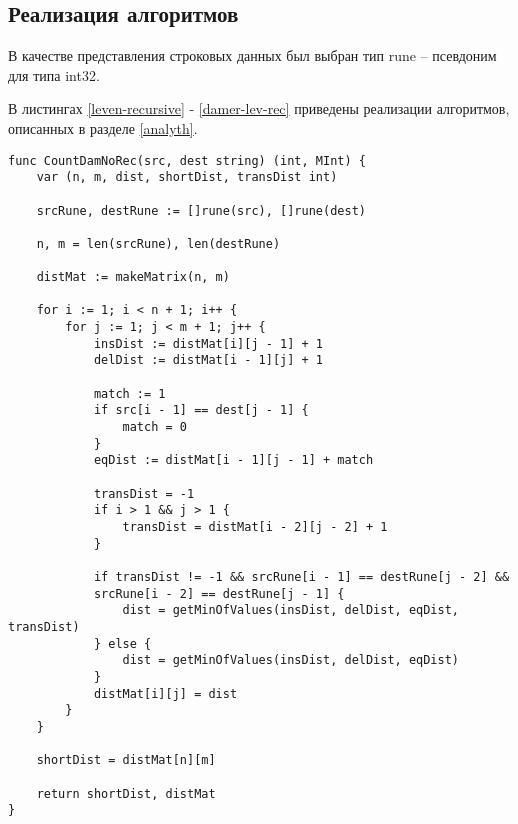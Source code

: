 \subsection{Реализация алгоритмов}

В качестве представления строковых данных был выбран тип rune\cite{rune} -- псевдоним для типа int32. 

В листингах \ref{leven-recursive} - \ref{damer-lev-rec} приведены реализации алгоритмов, описанных в разделе \ref{analyth}.


\begin{lstlisting}[label=leven-recursive,caption=Программный код нахождения расстояния Дамерау\,--\,Левенштейна итеративно]
func CountDamNoRec(src, dest string) (int, MInt) {
	var (n, m, dist, shortDist, transDist int)
	
	srcRune, destRune := []rune(src), []rune(dest)
	
	n, m = len(srcRune), len(destRune)
	
	distMat := makeMatrix(n, m)
	
	for i := 1; i < n + 1; i++ {
		for j := 1; j < m + 1; j++ {
			insDist := distMat[i][j - 1] + 1
			delDist := distMat[i - 1][j] + 1
			
			match := 1
			if src[i - 1] == dest[j - 1] {
				match = 0
			}
			eqDist := distMat[i - 1][j - 1] + match
			
			transDist = -1
			if i > 1 && j > 1 {
				transDist = distMat[i - 2][j - 2] + 1
			}
			
			if transDist != -1 && srcRune[i - 1] == destRune[j - 2] && 
			srcRune[i - 2] == destRune[j - 1] {
				dist = getMinOfValues(insDist, delDist, eqDist, transDist)
			} else {
				dist = getMinOfValues(insDist, delDist, eqDist)
			}
			distMat[i][j] = dist
		}
	}
	
	shortDist = distMat[n][m]
	
	return shortDist, distMat
}
\end{lstlisting}

